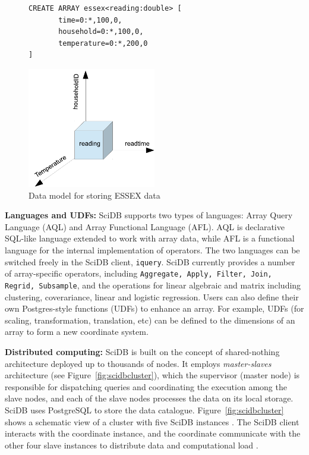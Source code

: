 \documentclass[a4paper,12pt]{llncs}
\begin{document}
\begin{figure}[htp]
\begin{minipage}{0.5\textwidth}
{\scriptsize
\begin{verbatim}
CREATE ARRAY essex<reading:double> [
       time=0:*,100,0,
       household=0:*,100,0,                       
       temperature=0:*,200,0
]
\end{verbatim}
}
\end{minipage}
\begin{minipage}{0.5\textwidth}
\includegraphics[width=0.5\textwidth]{images/scidbdatamodel}
\end{minipage}
\caption{Data model for storing ESSEX data}
\label{fig:essexdatamodel}
\end{figure}


 

{\bf Languages and UDFs:}
SciDB supports two types of languages: Array Query Language (AQL) and Array Functional Language (AFL). AQL is declarative SQL-like language extended to work with array data, while AFL is a functional language for the internal implementation of operators. The two languages can be switched freely in the SciDB client, \texttt{iquery}. SciDB currently provides a number of array-specific  operators, including \texttt{Aggregate, Apply, Filter, Join, Regrid, Subsample}, and the operations for linear algebraic and matrix including clustering, coverariance, linear and logistic regression. Users can also define their own Postgres-style functions (UDFs) to enhance an array. For example, UDFs (for  scaling, transformation, translation, etc) can be defined to the dimensions of an array to form a new coordinate system. 

{\bf Distributed computing:} SciDB is built on the concept of shared-nothing architecture deployed up to thousands of nodes. It employs {\em master-slaves} architecture (see Figure~\ref{fig:scidbcluster}), which the supervisor (master node) is responsible for dispatching queries and coordinating the execution among the slave nodes, and each of the slave nodes processes the data on its local storage. SciDB uses PostgreSQL to store the data catalogue. Figure~\ref{fig:scidbcluster}  shows a schematic view of a cluster with five SciDB instances \cite{scidbuserguide}. The SciDB client interacts with the coordinate instance, and the coordinate communicate with the other four slave instances to distribute data and computational load \cite{brown2010}. 
\end{document}
